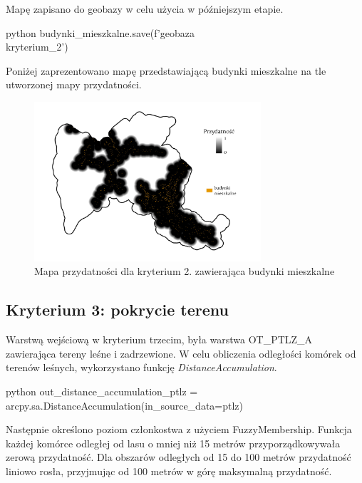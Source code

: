\documentclass{article}
\begin{document}
Mapę zapisano do geobazy w celu użycia w późniejszym etapie.
\vspace{5pt}

\begin{mintedbox}{python}
budynki_mieszkalne.save(f'{geobaza}\\kryterium_2')
\end{mintedbox}
\vspace{10pt}

Poniżej zaprezentowano mapę przedstawiającą budynki mieszkalne na tle utworzonej mapy przydatności.

\begin{figure}[H]
    \centering
    \includegraphics[width=0.75\textwidth]{img/kryterium2-budynki.jpg}
    \caption{Mapa przydatności dla kryterium 2. zawierająca budynki mieszkalne}
\end{figure}
\vspace{10pt}

\subsection{Kryterium 3: pokrycie terenu}
Warstwą wejściową w kryterium trzecim, była warstwa OT\_PTLZ\_A zawierająca tereny leśne i zadrzewione. W celu obliczenia odległości komórek od terenów leśnych, wykorzystano funkcję \textit{DistanceAccumulation}.
\vspace{5pt}

\begin{mintedbox}{python}
out_distance_accumulation_ptlz = arcpy.sa.DistanceAccumulation(in_source_data=ptlz)
\end{mintedbox}
\vspace{10pt}

Następnie określono poziom członkostwa z użyciem FuzzyMembership. Funkcja każdej komórce odległej od lasu o mniej niż 15 metrów przyporządkowywała zerową przydatność. Dla obszarów odległych od 15 do 100 metrów przydatność liniowo rosła, przyjmując od 100 metrów w górę maksymalną przydatność.
\vspace{5pt}
\end{document}

